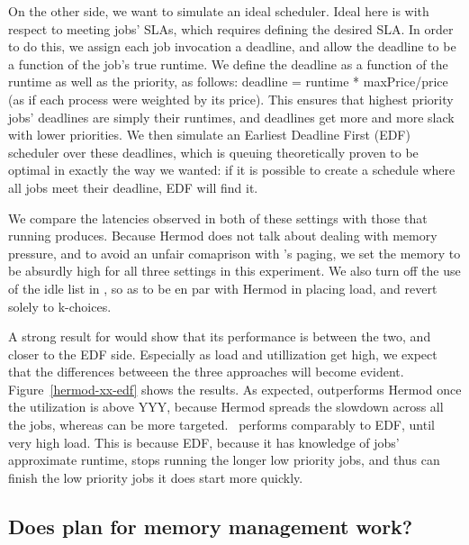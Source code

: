 On the other side, we want to simulate an ideal scheduler. Ideal here is with
respect to meeting jobs' SLAs, which requires defining the desired SLA. In order
to do this, we assign each job invocation a deadline, and allow the deadline to
be a function of the job's true runtime. We define the deadline as a function of
the runtime as well as the priority, as follows: deadline = runtime *
maxPrice/price (as if each process were weighted by its price). This ensures
that highest priority jobs' deadlines are simply their runtimes, and deadlines
get more and more slack with lower priorities. We then simulate an Earliest
Deadline First (EDF) scheduler over these deadlines, which is queuing
theoretically proven to be optimal in exactly the way we wanted: if it is
possible to create a schedule where all jobs meet their deadline, EDF will find
it\cite{TODO}.

We compare the latencies observed in both of these settings with those that
running \sys{} produces. Because Hermod does not talk about dealing with memory
pressure, and to avoid an unfair comaprison with \sys{}'s paging, we set the
memory to be absurdly high for all three settings in this experiment. We also
turn off the use of the idle list in \sys{}, so as to be en par with Hermod in
placing load, and revert solely to k-choices.

A strong result for \sys{} would show that its performance is between the two,
and closer to the EDF side. Especially as load and utillization get high, we
expect that the differences betweeen the three approaches will become evident.
Figure~\ref{hermod-xx-edf} shows the results. As expected, \sys{} outperforms
Hermod once the utilization is above YYY, because Hermod spreads the slowdown
across all the jobs, whereas \sys{} can be more targeted.~\sys{} performs
comparably to EDF, until very high load. This is because EDF, because it has
knowledge of jobs' approximate runtime, stops running the longer low priority
jobs, and thus can finish the low priority jobs it does start more quickly.


\subsection{Does \sys{} plan for memory management work?}


